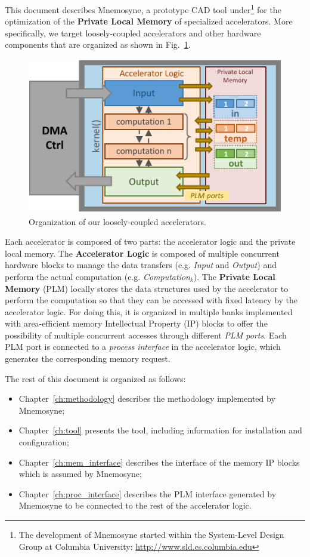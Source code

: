 
This document describes {\sc Mnemosyne}, a prototype CAD tool under\footnote{The development of {\sc Mnemosyne} started within the System-Level Design Group at Columbia
University: \url{http://www.sld.cs.columbia.edu}} for the
optimization of the {\bf Private Local Memory} of specialized
accelerators.
More specifically, we target loosely-coupled accelerators and other hardware components that are
organized as shown in Fig.~\ref{fig:accelerator}.

\begin{figure}[h!]
  \centering
  \includegraphics[width=0.5\columnwidth]{fig/accelerator.pdf}
  \caption{Organization of our loosely-coupled accelerators.}\label{fig:accelerator}
\end{figure}

Each accelerator is composed of two parts: the accelerator logic and
the private local memory. The {\bf Accelerator Logic} is composed of
multiple concurrent hardware blocks to manage the data transfers
(e.g. {\em Input} and {\em Output}) and perform the actual computation
(e.g. {\em Computation$_k$}). The {\bf Private Local Memory} (PLM)
locally stores the data structures used by the accelerator to perform
the computation so that they can be accessed with fixed latency by the
accelerator logic. For doing this, it is organized in multiple banks
implemented with area-efficient memory Intellectual Property (IP)
blocks to offer the possibility of multiple concurrent accesses
through different {\em PLM ports}. Each PLM port is connected to a
{\em process interface} in the accelerator logic, which generates the
corresponding memory request.

The rest of this document is organized as follows:
\begin{itemize}
\item Chapter~\ref{ch:methodology} describes the methodology
  implemented by {\sc Mnemosyne};
\item Chapter~\ref{ch:tool} presents the tool, including information
  for installation and configuration;
\item Chapter~\ref{ch:mem_interface} describes the interface of the
  memory IP blocks which is assumed by {\sc Mnemosyne};
\item Chapter~\ref{ch:proc_interface} describes the PLM interface
  generated by {\sc Mnemosyne} to be connected to the rest of the
  accelerator logic.
\end{itemize}

